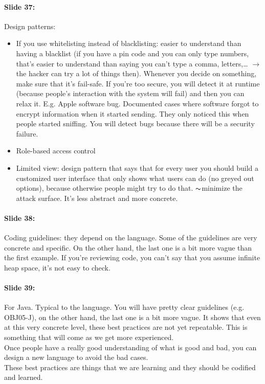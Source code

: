 \documentclass[10pt,a4paper]{report}
\begin{document}
\paragraph{Slide 37:} Design patterns: 
\begin{itemize}
\item If you use whitelisting instead of blacklisting: easier to understand than having a blacklist (if you have a pin code and you can only type numbers, that's easier to understand than saying you can't type a comma, letters,… $\rightarrow$ the hacker can try a lot of things then). Whenever you decide on something, make sure that it's fail-safe. If you're too secure, you will detect it at runtime (because people's interaction with the system will fail) and then you can relax it. E.g. Apple software bug. Documented cases where software forgot to encrypt information when it started sending. They only noticed this when people started sniffing. You will detect bugs because there will be a security failure. 
\item Role-based access control
\item Limited view: design pattern that says that for every user you should build a customized user interface that only shows what users can do (no greyed out options), because otherwise people might try to do that. $\thicksim$minimize the attack surface. It's less abstract and more concrete.
\end{itemize}

\paragraph{Slide 38:} Coding guidelines: they depend on the language. Some of the guidelines are very concrete and specific. On the other hand, the last one is a bit more vague than the first example. If you're reviewing code, you can't say that you assume infinite heap space, it's not easy to check.

\paragraph{Slide 39:} For Java. Typical to the language. You will have pretty clear guidelines (e.g. OBJ05-J), on the other hand, the last one is a bit more vague. It shows that even at this very concrete level, these best practices are not yet repeatable. This is something that will come as we get more experienced.\\
Once people have a really good understanding of what is good and bad, you can design a new language to avoid the bad cases. \\
These best practices are things that we are learning and they should be codified and learned.
\end{document}
